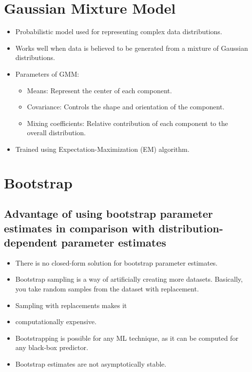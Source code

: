 \documentclass{article}
\begin{document}
\section{Gaussian Mixture Model}
\begin{itemize}
    \item Probabilistic model used for representing complex data distributions.
    \item Works well when data is believed to be generated from a mixture of Gaussian distributions.
    \item Parameters of GMM:
    \begin{itemize}
        \item Means: Represent the center of each component.
        \item Covariance: Controls the shape and orientation of the component.
        \item Mixing coefficients: Relative contribution of each component to the overall distribution.
    \end{itemize}
    \item Trained using Expectation-Maximization (EM) algorithm.
\end{itemize}

\section{Bootstrap}
\subsection{Advantage of using bootstrap parameter estimates in comparison with distribution-dependent parameter estimates}
\begin{itemize}
    \item There is no closed-form solution for bootstrap parameter estimates.
    \item Bootstrap sampling is a way of artificially creating more datasets. Basically, you take random samples from the dataset with replacement.
    \item Sampling with replacements makes it
    \item computationally expensive.
    \item Bootstrapping is possible for any ML technique, as it can be computed for any black-box predictor.
    \item Bootstrap estimates are not asymptotically stable.
\end{itemize}
\end{document}
